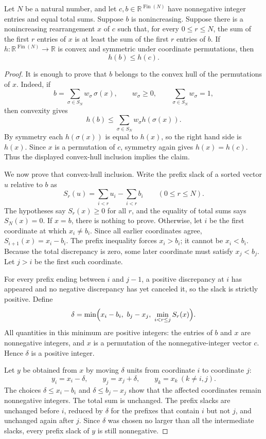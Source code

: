 \begin{helper}
Let \(N\) be a natural number, and let
\(c,b\in\mathbb R^{\operatorname{Fin}(N)}\) have nonnegative integer
entries and equal total sums.  Suppose \(b\) is nonincreasing.  Suppose
there is a nonincreasing rearrangement \(x\) of \(c\) such that, for every
\(0\le r\le N\), the sum of the first \(r\) entries of \(x\) is at least
the sum of the first \(r\) entries of \(b\).  If
\(h\colon\mathbb R^{\operatorname{Fin}(N)}\to\mathbb R\) is convex and
symmetric under coordinate permutations, then
\[
h(b)\le h(c).
\]
\end{helper}
\begin{proof}
It is enough to prove that \(b\) belongs to the convex hull of the
permutations of \(x\).  Indeed, if
\[
b=\sum_{\sigma\in S_N} w_\sigma\,\sigma(x),\qquad
w_\sigma\ge0,\qquad \sum_{\sigma\in S_N}w_\sigma=1,
\]
then convexity gives
\[
h(b)\le \sum_{\sigma\in S_N}w_\sigma h(\sigma(x)).
\]
By symmetry each \(h(\sigma(x))\) is equal to \(h(x)\), so the right hand
side is \(h(x)\).  Since \(x\) is a permutation of \(c\), symmetry again
gives \(h(x)=h(c)\).  Thus the displayed convex-hull inclusion implies the
claim.

We now prove that convex-hull inclusion.  Write the prefix slack of a sorted
vector \(u\) relative to \(b\) as
\[
S_r(u)=\sum_{i<r}u_i-\sum_{i<r}b_i\qquad(0\le r\le N).
\]
The hypotheses say \(S_r(x)\ge0\) for all \(r\), and the equality of total
sums says \(S_N(x)=0\).  If \(x=b\), there is nothing to prove.  Otherwise,
let \(i\) be the first coordinate at which \(x_i\ne b_i\).  Since all
earlier coordinates agree, \(S_{i+1}(x)=x_i-b_i\).  The prefix inequality
forces \(x_i>b_i\); it cannot be \(x_i<b_i\).  Because the total discrepancy
is zero, some later coordinate must satisfy \(x_j<b_j\).  Let \(j>i\) be the
first such coordinate.

For every prefix ending between \(i\) and \(j-1\), a positive discrepancy at
\(i\) has appeared and no negative discrepancy has yet canceled it, so the
slack is strictly positive.  Define
\[
\delta=\min\Bigl(x_i-b_i,\ b_j-x_j,\ \min_{i<r\le j}S_r(x)\Bigr).
\]
All quantities in this minimum are positive integers: the entries of
\(b\) and \(x\) are nonnegative integers, and \(x\) is a permutation of
the nonnegative-integer vector \(c\).  Hence \(\delta\) is a positive
integer.

Let \(y\) be obtained from \(x\) by moving \(\delta\) units from coordinate
\(i\) to coordinate \(j\):
\[
y_i=x_i-\delta,\qquad y_j=x_j+\delta,\qquad y_k=x_k\ (k\ne i,j).
\]
The choices \(\delta\le x_i-b_i\) and \(\delta\le b_j-x_j\) show that the
affected coordinates remain nonnegative integers.  The total sum is
unchanged.  The prefix slacks are unchanged before \(i\), reduced by
\(\delta\) for the prefixes that contain \(i\) but not \(j\), and unchanged
again after \(j\).  Since \(\delta\) was chosen no larger than all the
intermediate slacks, every prefix slack of \(y\) is still nonnegative.


\end{proof}
